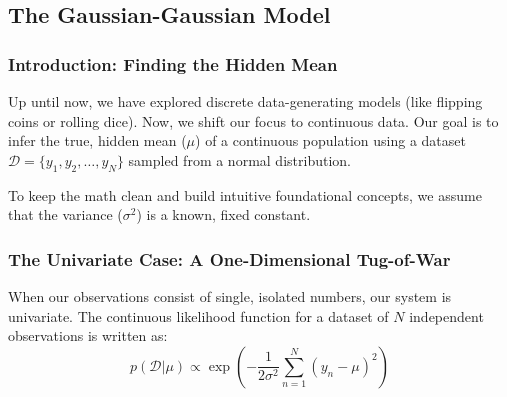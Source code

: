 \documentclass{article}
\begin{document}
\begin{table}[htbp]
\centering
\small
\renewcommand{\arraystretch}{1.3}
\caption{Comparative Profile of Point Estimates on a Three-Sided Simplex ($N_1=6, N_2=4, N_3=0$)}
\label{tab:dirichlet_summaries}
\end{table}

\subsection{The Gaussian-Gaussian Model}

\subsubsection{Introduction: Finding the Hidden Mean}
Up until now, we have explored discrete data-generating models (like flipping coins or rolling dice). Now, we shift our focus to continuous data. Our goal is to infer the true, hidden mean ($\mu$) of a continuous population using a dataset $\mathcal{D} = \{y_1, y_2, \dots, y_N\}$ sampled from a normal distribution. 

To keep the math clean and build intuitive foundational concepts, we assume that the variance ($\sigma^2$) is a known, fixed constant.

\subsubsection{The Univariate Case: A One-Dimensional Tug-of-War}
When our observations consist of single, isolated numbers, our system is univariate. The continuous likelihood function for a dataset of $N$ independent observations is written as:
\begin{equation}
p(\mathcal{D}|\mu) \propto \exp\left( -\frac{1}{2\sigma^2} \sum_{n=1}^N (y_n - \mu)^2 \right)
\end{equation}
\end{document}
